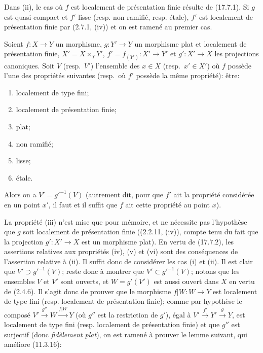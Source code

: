 Dans (ii), le cas où $f$ est localement de présentation finie résulte de (17.7.1). Si $g$ est quasi-compact et $f'$ lisse (resp. non ramifié, resp. étale), $f'$ est localement de présentation finie par (2.7.1, (iv)) et on est ramené au premier cas.

\begin{proposition}[17.7.4]
\label{IV.17.7.4}
Soient $f:X\to Y$ un morphisme, $g:Y'\to Y$ un morphisme plat et localement de présentation finie, $X'=X\times_Y Y'$, $f'=f_{(Y')}:X'\to Y'$ et $g':X'\to X$ les
projections canoniques. Soit $V$ \textup{(resp.}\ $V'$\textup{)} l'ensemble des $x\in X$ \textup{(resp.}\ $x'\in X'$\textup{)} où $f$ possède l'une des propriétés suivantes \textup{(resp.}\ où $f'$ possède la même propriété\textup{)}: être:
\begin{enumerate}
  \item[\textup{(i)}] localement de type fini;
  \item[\textup{(ii)}] localement de présentation finie;
  \item[\textup{(iii)}] plat;
  \item[\textup{(iv)}] non ramifié;
  \item[\textup{(v)}] lisse;
  \item[\textup{(vi)}] étale.
\end{enumerate}

Alors on a $V'=g'^{-1}(V)$ \textup{(autrement dit, pour que $f'$ ait la propriété considérée en un point $x'$, il faut et il suffit que $f$ ait cette propriété au point $x$)}.
\end{proposition}

La propriété (iii) n'est mise que pour mémoire, et ne nécessite pas l'hypothèse que $g$ soit localement de présentation finie ((2.2.11, (iv)), compte tenu du fait que la projection $g':X'\to X$ est un morphisme plat). En vertu de (17.7.2), les assertions relatives aux propriétés (iv), (v) et (vi) sont des conséquences de l'assertion relative à (ii). Il suffit donc de considérer les cas (i) et (ii). Il est clair que $V'\supset g'^{-1}(V)$; reste donc à montrer que $V'\subset g'^{-1}(V)$; notons que les ensembles $V$ et $V'$ sont ouverts, et $W=g'(V')$ est aussi ouvert dans $X$ en vertu de (2.4.6). Il s'agit donc de prouver que le morphisme $f|W:W\to Y$ est localement de type fini (resp. localement de présentation finie); comme par hypothèse le composé $V'\xrightarrow{g''}W\xrightarrow{f|W}Y$ (où $g''$ est la restriction de $g'$), égal à $V'\xrightarrow{f'}Y'\xrightarrow{g}Y$, est localement de type fini (resp. localement de présentation finie) et que $g''$ est surjectif (donc \emph{fidèlement plat}), on est ramené à prouver le lemme suivant, qui améliore (11.3.16):

